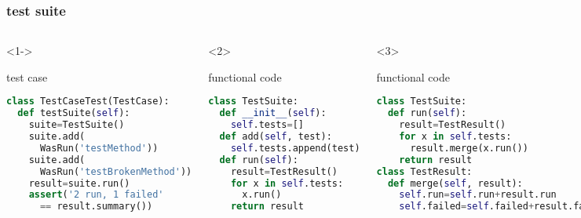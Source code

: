 \documentclass[lualatex]{beamer}
\begin{document}
\begin{frame}[fragile,t]
    \frametitle{test suite}

    \begin{columns}[t]
        \small
        \begin{onlyenv}<1->
            \begin{block}{test case}
                \begin{lstlisting}[language=Python,columns=fullflexible]
class TestCaseTest(TestCase):
  def testSuite(self):
    suite=TestSuite()
    suite.add(
      WasRun('testMethod'))
    suite.add(
      WasRun('testBrokenMethod'))
    result=suite.run()
    assert('2 run, 1 failed' 
      == result.summary())
                \end{lstlisting}
            \end{block}
        \end{onlyenv}

        \begin{onlyenv}<2>
            \begin{block}{functional code}
                \begin{lstlisting}[language=Python,columns=fullflexible]
class TestSuite:
  def __init__(self):
    self.tests=[]
  def add(self, test):
    self.tests.append(test)
  def run(self):
    result=TestResult()
    for x in self.tests:
      x.run()
    return result
                \end{lstlisting}
            \end{block}
        \end{onlyenv}

        \begin{onlyenv}<3>
            \begin{block}{functional code}
                \begin{lstlisting}[language=Python,columns=fullflexible]
class TestSuite:
  def run(self):
    result=TestResult()
    for x in self.tests:
      result.merge(x.run())
    return result
class TestResult:
  def merge(self, result):
    self.run=self.run+result.run
    self.failed=self.failed+result.failed
                \end{lstlisting}
            \end{block}
        \end{onlyenv}

    \end{columns}
\end{frame}
\end{document}
